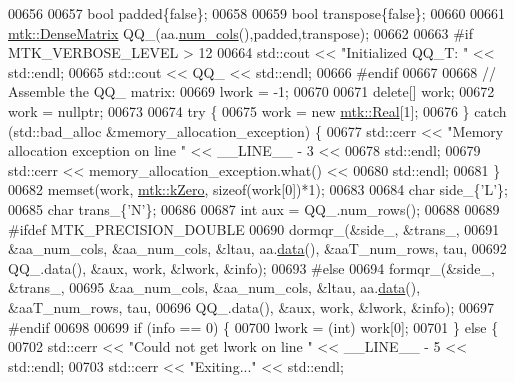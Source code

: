 \begin{DoxyCode}
00656 
00657   \textcolor{keywordtype}{bool} padded\{\textcolor{keyword}{false}\};
00658 
00659   \textcolor{keywordtype}{bool} transpose\{\textcolor{keyword}{false}\};
00660 
00661   \hyperlink{classmtk_1_1DenseMatrix}{mtk::DenseMatrix} QQ\_(aa.\hyperlink{classmtk_1_1DenseMatrix_a41747502d468c6728a4be31501b16e0e}{num\_cols}(),padded,transpose);
00662 
00663 \textcolor{preprocessor}{  #if MTK\_VERBOSE\_LEVEL > 12}
00664   std::cout << \textcolor{stringliteral}{"Initialized QQ\_T: "} << std::endl;
00665   std::cout << QQ\_ << std::endl;
00666 \textcolor{preprocessor}{  #endif}
00667 
00668   \textcolor{comment}{// Assemble the QQ\_ matrix:}
00669   lwork = -1;
00670 
00671   \textcolor{keyword}{delete}[] work;
00672   work = \textcolor{keyword}{nullptr};
00673 
00674   \textcolor{keywordflow}{try} \{
00675     work = \textcolor{keyword}{new} \hyperlink{group__c01-roots_gac080bbbf5cbb5502c9f00405f894857d}{mtk::Real}[1];
00676   \} \textcolor{keywordflow}{catch} (std::bad\_alloc &memory\_allocation\_exception) \{
00677     std::cerr << \textcolor{stringliteral}{"Memory allocation exception on line "} << \_\_LINE\_\_ - 3 <<
00678       std::endl;
00679     std::cerr << memory\_allocation\_exception.what() <<
00680       std::endl;
00681   \}
00682   memset(work, \hyperlink{group__c01-roots_ga59a451a5fae30d59649bcda274fea271}{mtk::kZero}, \textcolor{keyword}{sizeof}(work[0])*1);
00683 
00684   \textcolor{keywordtype}{char} side\_\{\textcolor{charliteral}{'L'}\};
00685   \textcolor{keywordtype}{char} trans\_\{\textcolor{charliteral}{'N'}\};
00686 
00687   \textcolor{keywordtype}{int} aux = QQ\_.num\_rows();
00688 
00689 \textcolor{preprocessor}{  #ifdef MTK\_PRECISION\_DOUBLE}
00690   dormqr\_(&side\_, &trans\_,
00691           &aa\_num\_cols, &aa\_num\_cols, &ltau, aa.\hyperlink{classmtk_1_1DenseMatrix_a0c33b8a9e01d157c61ddbdf807c25d84}{data}(), &aaT\_num\_rows, tau,
00692           QQ\_.data(), &aux, work, &lwork, &info);
00693 \textcolor{preprocessor}{  #else}
00694   formqr\_(&side\_, &trans\_,
00695           &aa\_num\_cols, &aa\_num\_cols, &ltau, aa.\hyperlink{classmtk_1_1DenseMatrix_a0c33b8a9e01d157c61ddbdf807c25d84}{data}(), &aaT\_num\_rows, tau,
00696           QQ\_.data(), &aux, work, &lwork, &info);
00697 \textcolor{preprocessor}{  #endif}
00698 
00699   \textcolor{keywordflow}{if} (info == 0) \{
00700     lwork = (int) work[0];
00701   \} \textcolor{keywordflow}{else} \{
00702     std::cerr << \textcolor{stringliteral}{"Could not get lwork on line "} << \_\_LINE\_\_ - 5 << std::endl;
00703     std::cerr << \textcolor{stringliteral}{"Exiting..."} << std::endl;

\end{DoxyCode}
